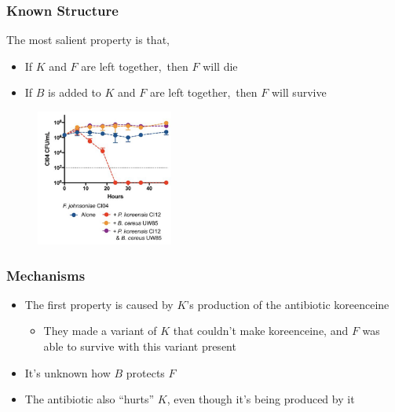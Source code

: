 \documentclass[hyperref={colorlinks=true, linkcolor=violet, citecolor=SeaGreen}]{beamer}
\begin{document}
\begin{frame}
  \frametitle{Known Structure}
  The most salient property is that,
  \begin{itemize}
    \item If $K$ and $F$ are left together, then $F$ will die
    \item If $B$ is added to $K$ and $F$ are left together, then $F$ will
    survive
  \end{itemize}

  \begin{figure}
    \includegraphics[width=0.4\textwidth]{thor}
  \end{figure}
\end{frame}

\begin{frame}
  \frametitle{Mechanisms}
\begin{itemize}
  \item The first property is caused by $K$'s production of the antibiotic
  koreenceine
  \begin{itemize}
    \item They made a variant of $K$ that couldn't make koreenceine, and $F$ was
    able to survive with this variant present
  \end{itemize}
  \item It's unknown how $B$ protects $F$
  \item The antibiotic also ``hurts'' $K$, even though it's being produced by it
\end{itemize}
\end{frame}
\end{document}
